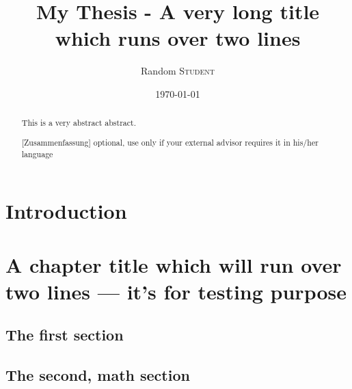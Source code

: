 \documentclass[11pt]{eapsthesis}
\title{My Thesis - A very long title\\ which runs over two
lines}
\date{\today}
\author{Random \textsc{Student}}
\begin{document}
\maketitle %

\onehalfspace %
\frontmatter %

\begin{abstract}
This is a very abstract abstract. 

\lipsum
\end{abstract}

\begin{abstract}[Zusammenfassung]
optional, use only if your external advisor requires it in his/her
language 
\\

\lipsum
\end{abstract}

\begin{acknowledgements}
\lipsum 
\end{acknowledgements}

\tableofcontents 

\listoffigures %
\listoftables %

\mainmatter

\chapter{Introduction}

\lipsum



\chapter[Short title]{A chapter title which will run over two lines --- it's for
  testing purpose}

\lipsum[1-2]

\section{The first section}
\lipsum[3-4]

 \section{The second, math section}
\end{document}
